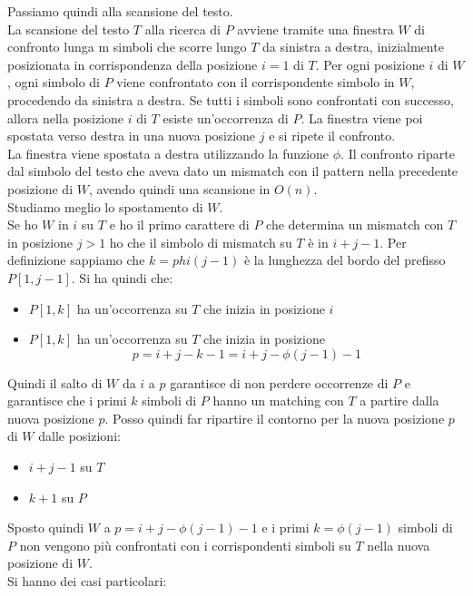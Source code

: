 \documentclass[a4paper,12pt, oneside]{book}
\begin{document}
Passiamo quindi alla scansione del testo.\\
La scansione del testo $T$ alla ricerca  di  $P$ avviene tramite una finestra
$W$ di confronto lunga m simboli che scorre lungo $T$ da sinistra a destra,
inizialmente posizionata in corrispondenza della posizione $i=1$ di $T$. Per
ogni posizione $i$ di $W$, ogni simbolo di $P$ viene confrontato con
il corrispondente simbolo in $W$, procedendo da sinistra a destra. Se
tutti i simboli sono confrontati con successo, allora nella posizione $i$ di $T$
esiste un’occorrenza di $P$. La finestra viene poi spostata verso destra in
una nuova posizione $j$ e si ripete il confronto.\\
La finestra viene spostata a destra utilizzando la funzione $\phi$. Il confronto
riparte dal simbolo del testo che aveva dato un mismatch con il pattern nella
precedente posizione di $W$, avendo quindi una scansione in $O(n)$.\\
Studiamo meglio lo spostamento di $W$.\\
Se ho $W$ in $i$ su $T$ e ho il primo carattere di $P$ che determina un mismatch
con $T$ in posizione $j>1$ ho che il simbolo di mismatch su $T$ è in
$i+j-1$. Per definizione sappiamo che $k=phi(j-1)$ è la lunghezza del bordo del
prefisso $P[1,j-1]$. Si ha quindi che:
\begin{itemize}
  \item $P[1,k]$ ha un’occorrenza su $T$ che inizia in posizione $i$
  \item $P[1,k]$ ha un’occorrenza su $T$ che inizia in posizione
  \[p=i+j-k-1=i+j-\phi(j-1)-1\]
\end{itemize}
Quindi il salto di $W$ da $i$ a $p$ garantisce di non perdere occorrenze di $P$
e garantisce che i primi $k$ simboli di $P$ hanno un matching con $T$ a partire
dalla nuova posizione $p$. Posso quindi far ripartire il contorno per la nuova
posizione $p$ di $W$ dalle posizioni:
\begin{itemize}
  \item $i+j-1$ su $T$
  \item $k+1$ su $P$
\end{itemize}
Sposto quindi $W$ a $p=i+j-\phi(j-1)-1$ e i primi $k=\phi(j-1)$ simboli di $P$
non vengono più confrontati con i corrispondenti simboli su $T$ nella nuova
posizione di $W$.\\
Si hanno dei casi particolari:
\end{document}

